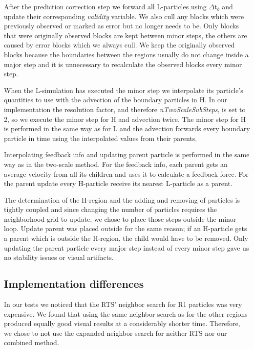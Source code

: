 \documentclass[../../main.tex]{subfiles}
\begin{document}
After the prediction correction step we forward all L-particles using $\Delta$t$_b$ and update their corresponding \textit{validity} variable. We also cull any blocks which were previously observed or marked as error but no longer needs to be. Only blocks that were originally observed blocks are kept between minor steps, the others are caused by error blocks which we always cull. We keep the originally observed blocks because the boundaries between the regions usually do not change inside a major step and it is unnecessary to recalculate the observed blocks every minor step. 

When the L-simulation has executed the minor step we interpolate its particle's quantities to use with the advection of the boundary particles in H. In our implementation the resolution factor, and therefore \textit{nTwoScaleSubSteps}, is set to 2, so we execute the minor step for H and advection twice. The minor step for H is performed in the same way as for L and the advection forwards every boundary particle in time using the interpolated values from their parents.

Interpolating feedback info and updating parent particle is performed in the same way as in the two-scale method. For the feedback info, each parent gets an average velocity from all its children and uses it to calculate a feedback force. For the parent update every H-particle receive its nearest L-particle as a parent. 

The determination of the H-region and the adding and removing of particles is tightly coupled and since changing the number of particles requires the neighborhood grid to update, we chose to place those steps outside the minor loop. Update parent was placed outside for the same reason; if an H-particle gets a parent which is outside the H-region, the child would have to be removed. Only updating the parent particle every major step instead of every minor step gave us no stability issues or visual artifacts. 


\subsection{Implementation differences}
In our tests we noticed that the RTS' neighbor search for R1 particles was very expensive. We found that using the same neighbor search as for the other regions produced equally good visual results at a considerably shorter time. Therefore, we chose to not use the expanded neighbor search for neither RTS nor our combined method. 
\end{document}
